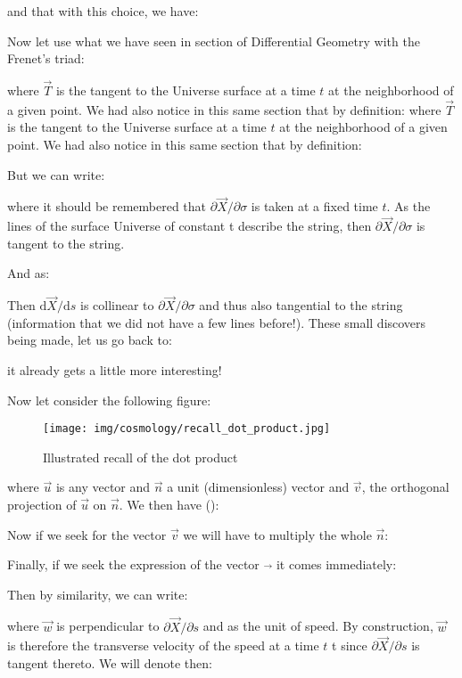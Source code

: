 	and that with this choice, we have:
	
	Now let use what we have seen in section of Differential Geometry with the Frenet's triad:
	
	where $\vec{T}$ is the tangent to the Universe surface at a time $t$ at the neighborhood of a given point. We had also notice in this same section that by definition:
	where $\vec{T}$ is the tangent to the Universe surface at a time $t$ at the neighborhood of a given point. We had also notice in this same section that by definition:
	
	But we can write:
	
	where it should be remembered that $\partial \vec{X}/\partial \sigma$ is taken at a fixed time $t$. As the lines of the surface Universe of constant $ $t describe the string, then $\partial \vec{X}/\partial \sigma$ is tangent to the string.

	And as:
	
	Then $\mathrm{d}\vec{X}/\mathrm{d}s$ is collinear to $\partial \vec{X}/\partial \sigma$ and thus also tangential to the string (information that we did not have a few lines before!). These small discovers being made, let us go back to:
	
	it already gets a little more interesting!

	Now let consider the following figure:
	\begin{figure}[H]
		\begin{center}
		\texttt{[image: img/cosmology/recall\_dot\_product.jpg]}
		\end{center}	
		\caption[]{Illustrated recall of the dot product}
	\end{figure}
	where $\vec{u}$ is any vector and $\vec{n}$ a unit (dimensionless) vector and $\vec{v}$, the orthogonal projection of $\vec{u}$ on $\vec{n}$. We then have ():
	
	Now if we seek for the vector $\vec{v}$ we will have to multiply  the whole $\vec{n}$:
	
	Finally, if we seek the expression of the vector $\vec{}$ it comes immediately:
	
	Then by similarity, we can write:
	
	where $\vec{w}$ is perpendicular to $\partial\vec{X}/\partial s$ and as the unit of speed. By construction, $\vec{w}$ is therefore the transverse velocity of the speed at a time $t$ t since $\partial\vec{X}/\partial s$ is tangent thereto. We will denote then:
	

